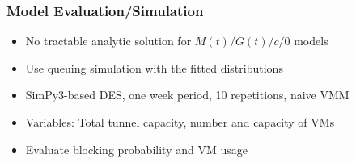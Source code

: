 \documentclass{beamer}
\begin{document}
\begin{frame}
	\frametitle{Model Evaluation/Simulation}

	\begin{itemize}
		\item No tractable analytic solution for $M(t)/G(t)/c/0$ models
		\item Use queuing simulation with the fitted distributions
		\item SimPy3-based DES, one week period, 10 repetitions, naive VMM
		\item Variables: Total tunnel capacity, number and capacity of VMs
		\item Evaluate blocking probability and VM usage
	\end{itemize}


\end{frame}

\end{document}
